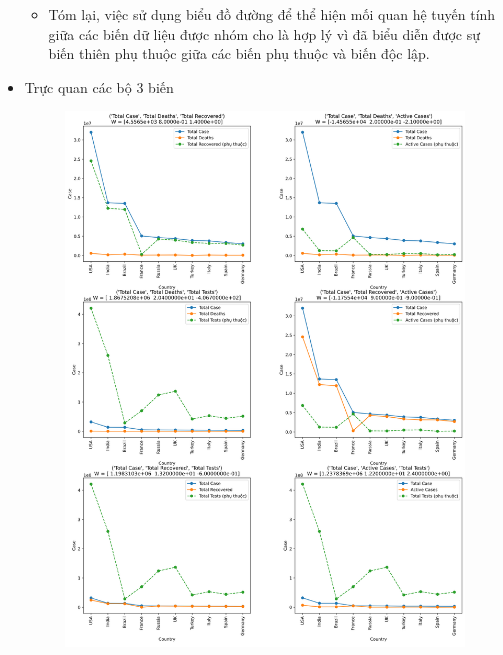 \documentclass[a4paper, 12pt]{article}
\begin{document}
\begin{itemize}
\begin{itemize}
            \item Tóm lại, việc sử dụng biểu đồ đường để thể hiện mối quan hệ tuyến tính giữa các biến dữ liệu được nhóm cho là hợp lý vì đã biểu diễn được sự biến thiên phụ thuộc giữa các biến phụ thuộc và biến độc lập.
        \end{itemize}
\newline 
        \item Trực quan các bộ 3 biến
        \begin{figure}[H]
            \begin{center}
                \includegraphics[scale=0.39]{img/relationship3Vars.png}
            \end{center}
        \end{figure}
        \begin{figure}[H]
            \begin{center}

\end{center}
\end{figure}
\end{itemize}
\end{document}
